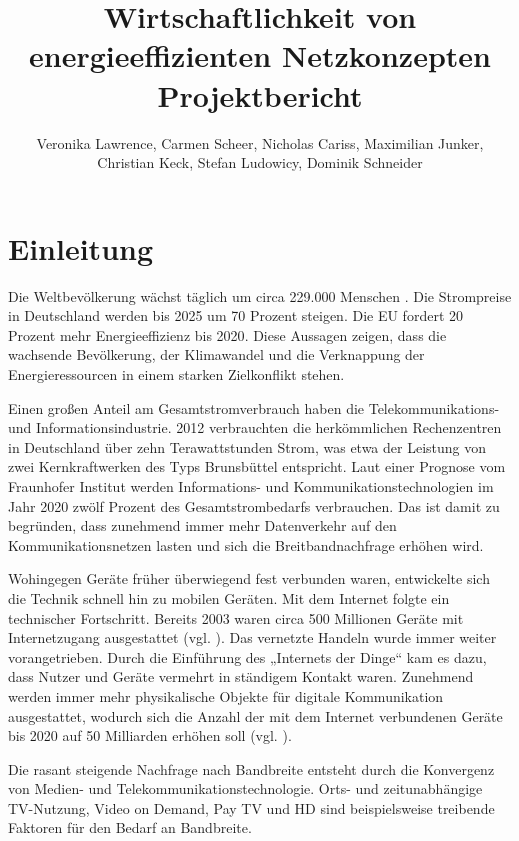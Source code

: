 \documentclass[12pt,titlepage]{article}
\title{\huge{Wirtschaftlichkeit von energieeffizienten Netzkonzepten} \\ \large{Projektbericht}}
\author{Veronika Lawrence, Carmen Scheer, Nicholas Cariss, Maximilian Junker,\\ Christian Keck, Stefan Ludowicy, Dominik Schneider}
\begin{document}
\maketitle
\newpage
\tableofcontents{}
\newpage
\listoffigures
\listoftables
\newpage

\section{Einleitung}
Die Weltbevölkerung wächst täglich um circa 229.000 Menschen \cite{statista:zuwachs}. Die Strompreise in Deutschland werden bis 2025 um 70 Prozent steigen\cite{welt:strompreise}. Die EU fordert 20 Prozent mehr Energieeffizienz bis 2020\cite{bmwi:energiepolitik}. Diese Aussagen zeigen, dass die wachsende Bevölkerung, der Klimawandel und die Verknappung der Energieressourcen in einem starken Zielkonflikt stehen. 


Einen großen Anteil am Gesamtstromverbrauch haben die Telekommunikations- und Informationsindustrie. 2012 verbrauchten die herkömmlichen Rechenzentren in Deutschland über zehn Terawattstunden Strom, was etwa der Leistung von zwei Kernkraftwerken des Typs Brunsbüttel entspricht. Laut einer Prognose vom Fraunhofer Institut werden Informations- und Kommunikationstechnologien im Jahr 2020 zwölf Prozent des Gesamtstrombedarfs verbrauchen\cite{fraunhofer:energiebedarf}. Das ist damit zu begründen, dass zunehmend immer mehr Datenverkehr auf den Kommunikationsnetzen lasten und sich die Breitbandnachfrage erhöhen wird. 



Wohingegen Geräte früher überwiegend fest verbunden waren, entwickelte sich die Technik schnell hin zu mobilen Geräten. Mit dem Internet folgte ein technischer Fortschritt. Bereits 2003 waren circa 500 Millionen Geräte  mit Internetzugang ausgestattet (vgl. \cite{cisco}). Das vernetzte Handeln wurde immer weiter vorangetrieben. Durch die Einführung des „Internets der Dinge“ kam es dazu, dass Nutzer und Geräte vermehrt in ständigem Kontakt waren. Zunehmend werden immer mehr physikalische Objekte für digitale Kommunikation ausgestattet, wodurch sich die Anzahl der mit dem Internet verbundenen Geräte bis 2020 auf 50 Milliarden  erhöhen soll (vgl. \cite{cisco}). 


Die rasant steigende Nachfrage nach Bandbreite entsteht durch die Konvergenz von Medien- und Telekommunikationstechnologie. Orts- und zeitunabhängige TV-Nutzung, Video on Demand, Pay TV und HD sind beispielsweise treibende Faktoren für den Bedarf an Bandbreite.
\end{document}
